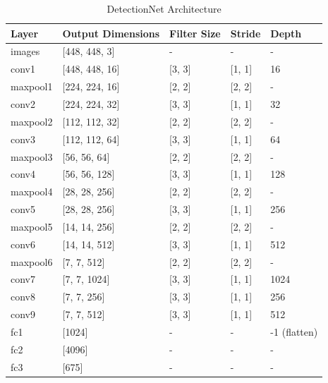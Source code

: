 \documentclass{article}
\begin{document}
\begin{table}[h!]
\centering
\begin{tabular}{|l|l|l|l|l|}
\hline
Layer    & Output Dimensions  & Filter Size & Stride     & Depth        \\ \hline
images   & {[}448, 448, 3{]}  & -           & -          & -            \\ \hline
conv1    & {[}448, 448, 16{]} & {[}3, 3{]}  & {[}1, 1{]} & 16           \\ \hline
maxpool1 & {[}224, 224, 16{]} & {[}2, 2{]}  & {[}2, 2{]} & -            \\ \hline
conv2    & {[}224, 224, 32{]} & {[}3, 3{]}  & {[}1, 1{]} & 32           \\ \hline
maxpool2 & {[}112, 112, 32{]} & {[}2, 2{]}  & {[}2, 2{]} & -            \\ \hline
conv3    & {[}112, 112, 64{]} & {[}3, 3{]}  & {[}1, 1{]} & 64           \\ \hline
maxpool3 & {[}56, 56, 64{]}   & {[}2, 2{]}  & {[}2, 2{]} & -            \\ \hline
conv4    & {[}56, 56, 128{]}  & {[}3, 3{]}  & {[}1, 1{]} & 128          \\ \hline
maxpool4 & {[}28, 28, 256{]}  & {[}2, 2{]}  & {[}2, 2{]} & -            \\ \hline
conv5    & {[}28, 28, 256{]}  & {[}3, 3{]}  & {[}1, 1{]} & 256          \\ \hline
maxpool5 & {[}14, 14, 256{]}  & {[}2, 2{]}  & {[}2, 2{]} & -            \\ \hline
conv6    & {[}14, 14, 512{]}  & {[}3, 3{]}  & {[}1, 1{]} & 512          \\ \hline
maxpool6 & {[}7, 7, 512{]}    & {[}2, 2{]}  & {[}2, 2{]} & -            \\ \hline
conv7    & {[}7, 7, 1024{]}   & {[}3, 3{]}  & {[}1, 1{]} & 1024         \\ \hline
conv8    & {[}7, 7, 256{]}    & {[}3, 3{]}  & {[}1, 1{]} & 256          \\ \hline
conv9    & {[}7, 7, 512{]}    & {[}3, 3{]}  & {[}1, 1{]} & 512          \\ \hline
fc1      & {[}1024{]}         & -           & -          & -1 (flatten) \\ \hline
fc2      & {[}4096{]}         & -           & -          & -            \\ \hline
fc3      & {[}675{]}          & -           & -          & -            \\ \hline
\end{tabular}
\caption{DetectionNet Architecture}
\end{table}
\end{document}
